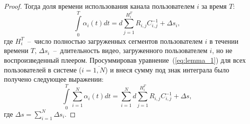 \begin{proof}

Тогда доля времени использования канала пользователем $i$ за время $T$:
\begin{equation}
	\label{eq:lemma_1}
	\int\limits_{0}^{T}\alpha_i(t) dt = d\sum\limits_{j=1}^{H_i^T}R_{i,j}C_{i,j}^{-1} + \Delta s_i,
\end{equation}
где $H_i^T$~--~число полностью загруженных сегментов пользователем $i$ в течении времени $T$, $\Delta s_i$~--~длительность видео, загруженного пользователем $i$, но не воспроизведенный плеером. Просуммировав уравнение~(\ref{eq:lemma_1}) для всех пользователей в системе ($i=\overline{1,N}$) и внеся сумму под знак интеграла было получено следующее выражении:
\begin{equation}
	\nonumber
	\int\limits_{0}^{T}\sum\limits_{i=1}^{N}\alpha_i(t)dt = \sum\limits_{i=1}^{N}d\sum\limits_{j=1}^{H_i^T}R_{i,j}C_{i,j}^{-1} + \Delta s,
\end{equation}
где $\Delta s = \sum\limits_{i=1}^{N} \Delta s_i$.


\end{proof}
